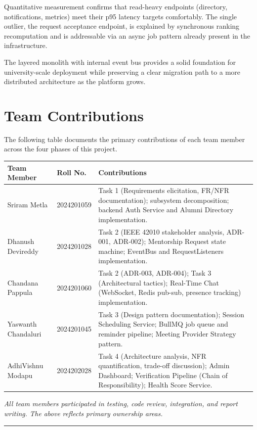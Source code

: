 \documentclass[12pt,a4paper]{article}
\begin{document}
Quantitative measurement confirms that read-heavy endpoints (directory, notifications, metrics) meet their p95 latency targets comfortably. The single outlier, the request acceptance endpoint, is explained by synchronous ranking recomputation and is addressable via an async job pattern already present in the infrastructure.

The layered monolith with internal event bus provides a solid foundation for university-scale deployment while preserving a clear migration path to a more distributed architecture as the platform grows.

\newpage

\section*{Team Contributions}
{}

The following table documents the primary contributions of each team member across the four phases of this project.

\begin{center}
\renewcommand{\arraystretch}{1.4}
\begin{tabular}{@{}p{3.8cm} p{2.2cm} p{7.2cm}@{}}
\toprule
\textbf{Team Member} & \textbf{Roll No.} & \textbf{Contributions} \\
\midrule
Sriram Metla & 2024201059 & Task 1 (Requirements elicitation, FR/NFR documentation); subsystem decomposition; backend Auth Service and Alumni Directory implementation. \\
Dhanush Devireddy & 2024201028 & Task 2 (IEEE 42010 stakeholder analysis, ADR-001, ADR-002); Mentorship Request state machine; EventBus and RequestListeners implementation. \\
Chandana Pappula & 2024201060 & Task 2 (ADR-003, ADR-004); Task 3 (Architectural tactics); Real-Time Chat (WebSocket, Redis pub-sub, presence tracking) implementation. \\
Yaswanth Chandaluri & 2024201045 & Task 3 (Design pattern documentation); Session Scheduling Service; BullMQ job queue and reminder pipeline; Meeting Provider Strategy pattern. \\
AdhiVishnu Modapu & 2024202028 & Task 4 (Architecture analysis, NFR quantification, trade-off discussion); Admin Dashboard; Verification Pipeline (Chain of Responsibility); Health Score Service. \\
\bottomrule
\end{tabular}
\end{center}

\vspace{1.2em}
\noindent\textit{All team members participated in testing, code review, integration, and report writing. The above reflects primary ownership areas.}

\vspace{2em}
\hrule
\vspace{1em}
\end{document}
